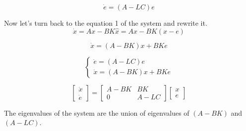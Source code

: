 \begin{equation}
    \dot e = (A-LC)e
\end{equation}

Now let's turn back to the equation 1 of the system and rewrite it. 
\[\dot  x = Ax - BK \hat x = Ax - BK(x-e)\]

\begin{equation}
    \dot  x = (A-BK)x + BKe
\end{equation}

\[
\begin{cases}
    \dot e = (A - LC) e \\
    \dot x = (A - BK)x + BKe
\end{cases}
\] 

\[
\begin{bmatrix}
    \dot x \\ 
    \dot e
\end{bmatrix} = 
\begin{bmatrix}
    A-BK & BK \\ 
    0 & A - LC
\end{bmatrix} 
\begin{bmatrix}
    x \\ 
    e
\end{bmatrix}
\]

The eigenvalues of the system are the union of eigenvalues of $(A-  BK)$ and $(A-LC)$. 